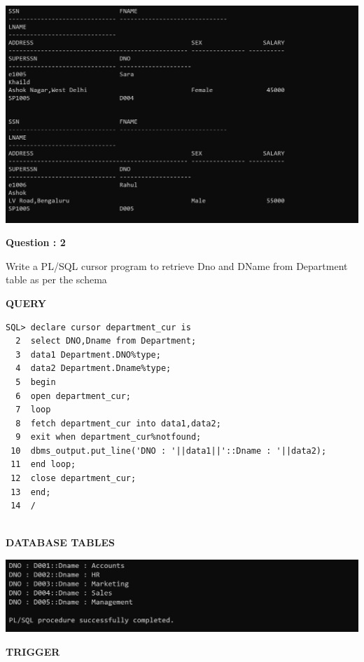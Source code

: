 \documentclass[a4paper,12pt]{report}
\begin{document}
\includegraphics[scale=0.2]{C1_op4.png}

\begin{flushleft}
    \textbf{Question : 2}
\end{flushleft}
Write a PL/SQL cursor program to retrieve Dno and DName from Department table as per the schema
\begin{flushleft}
\textbf{QUERY }
\end{flushleft}
 \begin{verbatim}
SQL> declare cursor department_cur is
  2  select DNO,Dname from Department;
  3  data1 Department.DNO%type;
  4  data2 Department.Dname%type;
  5  begin
  6  open department_cur;
  7  loop
  8  fetch department_cur into data1,data2;
  9  exit when department_cur%notfound;
 10  dbms_output.put_line('DNO : '||data1||'::Dname : '||data2);
 11  end loop;
 12  close department_cur;
 13  end;
 14  /


\end{verbatim}
\begin{flushleft}
\textbf{DATABASE TABLES}
\end{flushleft}
\includegraphics[scale=0.45]{C2.png}






\newpage


\newpage
\begin{center}
\large\textbf{TRIGGER}
\end{center}
\end{document}
